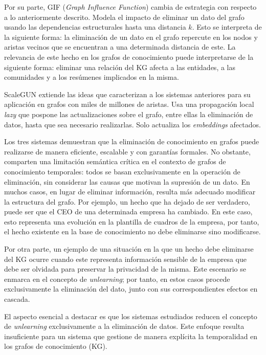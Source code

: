 Por su parte, GIF (\emph{Graph Influence Function}) cambia de estrategia con respecto a lo anteriormente descrito. Modela el impacto de eliminar un dato del grafo usando las dependencias estructurales hasta una distancia $k$. Esto se interpreta de la siguiente forma: la eliminación de un dato en el grafo repercute en los nodos y aristas vecinos que se encuentran a una determinada distancia de este. La relevancia de este hecho en los grafos de conocimiento puede interpretarse de la siguiente forma: eliminar una relación del KG afecta a las entidades, a las comunidades y a los resúmenes implicados en la misma.

ScaleGUN extiende las ideas que caracterizan a los sistemas anteriores para su aplicación en grafos con miles de millones de aristas. Usa una propagación local \emph{lazy} que pospone las actualizaciones sobre el grafo, entre ellas la eliminación de datos, hasta que sea necesario realizarlas. Solo actualiza los \emph{embeddings} afectados.

Los tres sistemas demuestran que la eliminación de conocimiento en grafos puede realizarse de manera eficiente, escalable y con garantías formales. No obstante, comparten una limitación semántica crítica en el contexto de grafos de conocimiento temporales: todos se basan exclusivamente en la operación de eliminación, sin considerar las causas que motivan la supresión de un dato. En muchos casos, en lugar de eliminar información, resulta más adecuado modificar la estructura del grafo. Por ejemplo, un hecho que ha dejado de ser verdadero, puede ser que el CEO de una determinada empresa ha cambiado. En este caso, esto representa una evolución en la plantilla de cuadros de la empresa, por tanto, el hecho existente en la base de conocimiento no debe eliminarse sino modificarse.

Por otra parte, un ejemplo de una situación en la que un hecho debe eliminarse del KG ocurre cuando este representa información sensible de la empresa que debe ser olvidada para preservar la privacidad de la misma. Este escenario se enmarca en el concepto de \emph{unlearning}; por tanto, en estos casos procede exclusivamente la eliminación del dato, junto con sus correspondientes efectos en cascada.

El aspecto esencial a destacar es que los sistemas estudiados reducen el concepto de \emph{unlearning} exclusivamente a la eliminación de datos. Este enfoque resulta insuficiente para un sistema que gestione de manera explícita la temporalidad en los grafos de conocimiento (KG).


